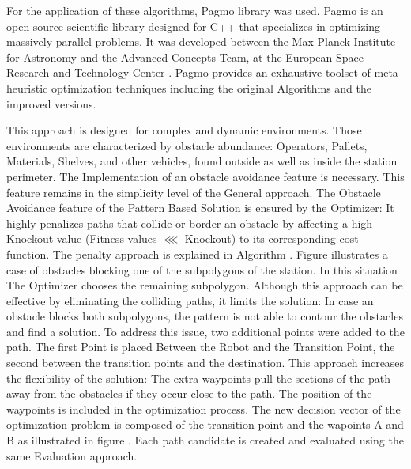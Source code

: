For the application of these algorithms, Pagmo library was used. Pagmo is an open-source scientific library designed for 
C++ that specializes in optimizing massively parallel problems. It was developed between the Max Planck Institute for 
Astronomy and the Advanced Concepts Team, at the European Space Research and Technology Center \cite{R45}.
Pagmo provides an exhaustive toolset of meta-heuristic optimization techniques including the original Algorithms
and the improved versions. 


This approach is designed for complex and dynamic environments. 
Those environments are characterized by obstacle abundance: Operators, Pallets, 
Materials, Shelves, and other vehicles, found outside as well as inside the station perimeter.
The Implementation of an obstacle avoidance feature is necessary. 
This feature remains in the simplicity level of the General approach.
The Obstacle Avoidance feature of the Pattern Based Solution is ensured by the 
Optimizer: It highly penalizes paths that collide or border an obstacle by affecting a high 
Knockout value (Fitness values $\lll$ Knockout) to its corresponding cost function. The penalty approach is explained 
in Algorithm .
Figure  illustrates a case of obstacles blocking one of the subpolygons of the station.
In this situation The Optimizer chooses the remaining subpolygon. 
Although this approach can be effective by eliminating the colliding paths, it limits 
the solution: In case an obstacle blocks both subpolygons, the pattern is not able to contour 
the obstacles and find a solution.
To address this issue, two additional points were added to the path. The first Point is placed 
Between the Robot and the Transition Point, the second between the transition points and the destination. 
This approach increases the flexibility of the solution: The extra waypoints pull the sections of the path 
away from the obstacles if they occur close to the path. 
The position of the waypoints is included in the optimization process. The new decision vector of the optimization 
problem is composed of the transition point and the wapoints A and B as illustrated in figure .
Each path candidate is created and evaluated using the same Evaluation approach. 


